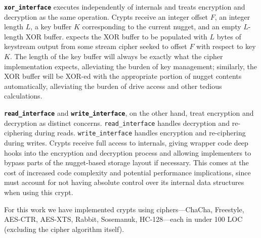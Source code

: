 
{\bf \texttt{xor\_interface}} executes independently of \sys internals and
treats encryption and decryption as the same operation. Crypts receive an
integer offset $F$, an integer length $L$, a key buffer $K$ corresponding to the
current nugget, and an empty $L$-length XOR buffer. \sys expects the XOR buffer
to be populated with $L$ bytes of keystream output from some stream cipher
seeked to offset $F$ with respect to key $K$. The length of the key buffer will
always be exactly what the cipher implementation expects, alleviating the burden
of key management; similarly, the XOR buffer will be XOR-ed with the appropriate
portion of nugget contents automatically, alleviating the burden of drive access
and other tedious calculations.


{\bf \texttt{read\_interface}} and {\bf \texttt{write\_interface}}, on the other
hand, treat encryption and decryption as distinct concerns.
\texttt{read\_interface} handles decryption and re-ciphering during reads.
\texttt{write\_interface} handles encryption and re-ciphering during writes.
Crypts receive full access to \sys internals, giving wrapper code deep hooks
into the encryption and decryption process and allowing implementers to bypass
parts of the nugget-based storage layout if necessary. This comes at the cost of
increased code complexity and potential performance implications, since \sys
must account for not having absolute control over its internal data structures
when using this crypt.

For this work we have implemented \numConfigs crypts using \numCiphers
ciphers---ChaCha, Freestyle, AES-CTR, AES-XTS, Rabbit, Sosemanuk, HC-128---each
in under 100 LOC (excluding the cipher algorithm itself).
